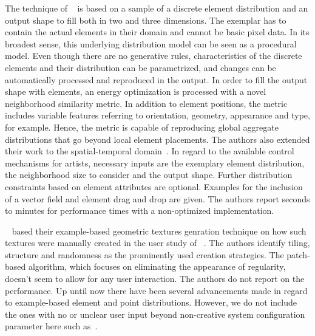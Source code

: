 The technique of \citeauthor*{ma_2011_det}~\cite{ma_2011_det} is based on a sample of a discrete element distribution and an output shape to fill both in two and three dimensions. The exemplar has to contain the actual elements in their domain and cannot be basic pixel data. In its broadest sense, this underlying distribution model can be seen as a procedural model. Even though there are no generative rules, characteristics of the discrete elements and their distribution can be parametrized, and changes can be automatically processed and reproduced in the output. In order to fill the output shape with elements, an energy optimization is processed with a novel neighborhood similarity metric. In addition to element positions, the metric includes  variable features referring to orientation, geometry, appearance and type, for example. Hence, the metric is capable of reproducing global aggregate distributions that go beyond local element placements. The authors also extended their work to the spatial-temporal domain~\cite{ma_2013_det}. In regard to the available control mechanisms for artists, necessary inputs are the exemplary element distribution, the neighborhood size to consider and the output shape. Further distribution constraints based on element attributes are optional. Examples for the inclusion of a vector field and element drag and drop are given. The authors report seconds to minutes for performance times with a non-optimized implementation.

\citeauthor*{almeraj_2013_pgt}~\cite{almeraj_2013_pgt} based their example-based geometric textures genration technique  on how such textures were manually created in the user study of \citeauthor*{almeraj_2011_tgt}~\cite{almeraj_2011_tgt}. The authors identify tiling, structure and randomness as the prominently used creation strategies. The patch-based algorithm, which focuses on eliminating the appearance of regularity, doesn't seem to allow for any user interaction. The authors do not report on the performance. Up until now there have been several advancements made in regard to example-based element and point distributions. However, we do not include the ones with no or unclear user input beyond non-creative system configuration parameter here such as~\cite{peihan_2019_pps, chen_2019_mpc}.




